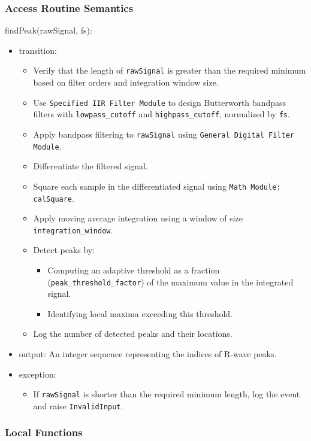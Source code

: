 \documentclass[12pt, titlepage]{article}
\begin{document}
\subsubsection{Access Routine Semantics}

\noindent findPeak(rawSignal, fs):
\begin{itemize}
\item transition:
    \begin{itemize}
    \item Verify that the length of \texttt{rawSignal} is greater than the
    required minimum based on filter orders and integration window size.
    \item Use \texttt{Specified IIR Filter Module} to design Butterworth
    bandpass filters with \texttt{lowpass\_cutoff} and
    \texttt{highpass\_cutoff}, normalized by \texttt{fs}.
    \item Apply bandpass filtering to \texttt{rawSignal} using \texttt{General
    Digital Filter Module}.
    \item Differentiate the filtered signal.
    \item Square each sample in the differentiated signal using \texttt{Math
    Module: calSquare}.
    \item Apply moving average integration using a window of size
    \texttt{integration\_window}.
    \item Detect peaks by:
        \begin{itemize}
        \item Computing an adaptive threshold as a fraction
        (\texttt{peak\_threshold\_factor}) of the maximum value in the
        integrated signal.
        \item Identifying local maxima exceeding this threshold.
        \end{itemize}
    \item Log the number of detected peaks and their locations.
    \end{itemize}
\item output: An integer sequence representing the indices of R-wave peaks.
\item exception:
    \begin{itemize}
    \item If \texttt{rawSignal} is shorter than the required minimum length, log
    the event and raise \texttt{InvalidInput}.
    \end{itemize}
\end{itemize}

\subsubsection{Local Functions}
\end{document}
